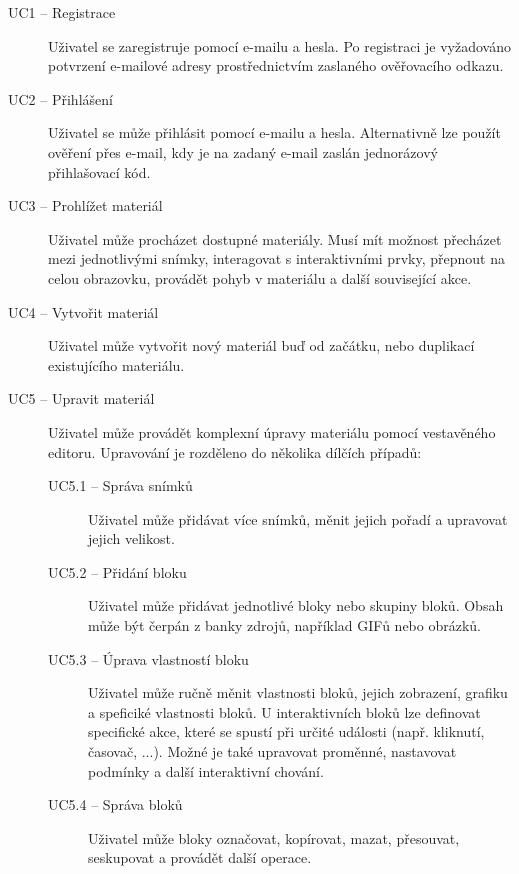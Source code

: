 \begin{description}
    \item[UC1 -- Registrace]
    Uživatel se zaregistruje pomocí e-mailu a hesla. Po registraci je vyžadováno potvrzení e-mailové adresy prostřednictvím zaslaného ověřovacího odkazu.

    \item[UC2 -- Přihlášení]
    Uživatel se může přihlásit pomocí e-mailu a hesla. Alternativně lze použít ověření přes e-mail, kdy je na zadaný e-mail zaslán jednorázový přihlašovací kód.
    
    \item[UC3 -- Prohlížet materiál]
    Uživatel může procházet dostupné materiály. Musí mít možnost přecházet mezi jednotlivými snímky, interagovat s interaktivními prvky, přepnout na celou obrazovku, provádět pohyb v materiálu a další související akce.
    
    \item[UC4 -- Vytvořit materiál]
    Uživatel může vytvořit nový materiál buď od začátku, nebo duplikací existujícího materiálu.
    
    \item[UC5 -- Upravit materiál]
    Uživatel může provádět komplexní úpravy materiálu pomocí vestavěného editoru. Upravování je rozděleno do několika dílčích případů:
        
        \begin{description}
            \item[UC5.1 -- Správa snímků]
            Uživatel může přidávat více snímků, měnit jejich pořadí a upravovat jejich velikost.
            
            \item[UC5.2 -- Přidání bloku]
            Uživatel může přidávat jednotlivé bloky nebo skupiny bloků. Obsah může být čerpán z banky zdrojů, například GIFů nebo obrázků.
            
            \item[UC5.3 -- Úprava vlastností bloku]
            Uživatel může ručně měnit vlastnosti bloků, jejich zobrazení, grafiku a speficiké vlastnosti bloků. U interaktivních bloků lze definovat specifické akce, které se spustí při určité události (např. kliknutí, časovač, ...). Možné je také upravovat proměnné, nastavovat podmínky a další interaktivní chování.
            
            \item[UC5.4 -- Správa bloků]
            Uživatel může bloky označovat, kopírovat, mazat, přesouvat, seskupovat a provádět další operace.
            

\end{description}
\end{description}
